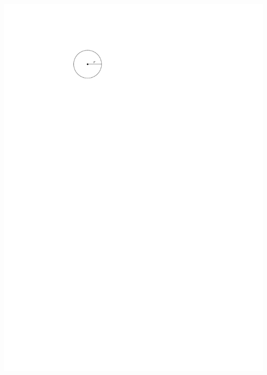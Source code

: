 \documentclass[12pt]{amsart}
\begin{document}
\begin{enumerate}[resume]
\includegraphics[scale = 0.8]{circle}


\end{enumerate}
\end{document}
